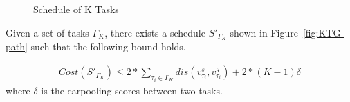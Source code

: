 \documentclass[sigconf,anonymous]{aamas}
\begin{document}
\begin{figure}[ht]
  \centering
  \caption{Schedule of K Tasks}
  \label{PKT}
\end{figure}

\begin{theorem}
    \label{thm:TaskGroupCost}
    Given a set of tasks $\Gamma_K$, there exists a schedule $S'_{\Gamma_K}$ shown in Figure~\ref{fig:KTG-path} 
    such that the following bound holds.
    
    \begin{eqnarray}
        \label{eq:tgc}
        Cost(S'_{\Gamma_K}) \leq 2 {\ast} \sum_{\tau_i \in \Gamma_K}{dis(v^{s}_{\tau_i}, v^{g}_{\tau_i})} 
        + 2{\ast}(K-1)\delta
    \end{eqnarray}
    where $\delta$ is the carpooling scores between two tasks.
\end{theorem}
\end{document}
